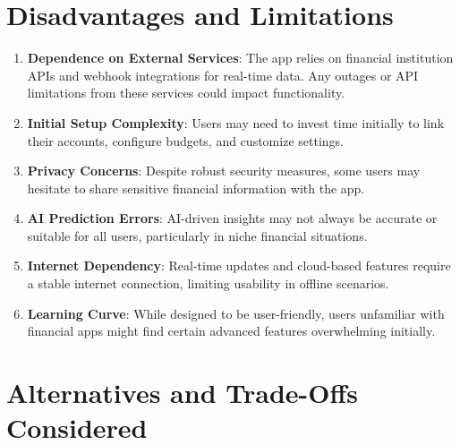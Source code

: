 \section{Disadvantages and Limitations}

\begin{enumerate}
    \item \textbf{Dependence on External Services}: The app relies on financial institution APIs and webhook integrations for real-time data. Any outages or API limitations from these services could impact functionality.

    \item \textbf{Initial Setup Complexity}: Users may need to invest time initially to link their accounts, configure budgets, and customize settings.

    \item \textbf{Privacy Concerns}: Despite robust security measures, some users may hesitate to share sensitive financial information with the app.

    \item \textbf{AI Prediction Errors}: AI-driven insights may not always be accurate or suitable for all users, particularly in niche financial situations.

    \item \textbf{Internet Dependency}: Real-time updates and cloud-based features require a stable internet connection, limiting usability in offline scenarios.

    \item \textbf{Learning Curve}: While designed to be user-friendly, users unfamiliar with financial apps might find certain advanced features overwhelming initially.
\end{enumerate}

\section{Alternatives and Trade-Offs Considered}

